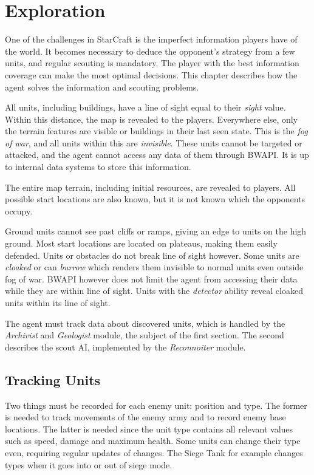 \chapter{Exploration}
\label{ch:exploration}
One of the challenges in StarCraft is the imperfect information players have of the world. It becomes necessary to deduce the opponent's strategy from a few units, and regular scouting is mandatory. The player with the best information coverage can make the most optimal decisions. This chapter describes how the agent solves the information and scouting problems.

All units, including buildings, have a line of sight equal to their \emph{sight} value. Within this distance, the map is revealed to the players. Everywhere else, only the terrain features are visible or buildings in their last seen state. This is the \emph{fog of war}, and all units within this are \emph{invisible}. These units cannot be targeted or attacked, and the agent cannot access any data of them through BWAPI. It is up to internal data systems to store this information.

The entire map terrain, including initial resources, are revealed to players. All possible start locations are also known, but it is not known which the opponents occupy.

Ground units cannot see past cliffs or ramps, giving an edge to units on the high ground. Most start locations are located on plateaus, making them easily defended. Units or obstacles do not break line of sight however. Some units are \emph{cloaked} or can \emph{burrow} which renders them invisible to normal units even outside fog of war. BWAPI however does not limit the agent from accessing their data while they are within line of sight. Units with the \emph{detector} ability reveal cloaked units within its line of sight.

The agent must track data about discovered units, which is handled by the \emph{Archivist} and \emph{Geologist} module, the subject of the first section. The second describes the scout AI, implemented by the \emph{Reconnoiter} module.

\section{Tracking Units}
Two things must be recorded for each enemy unit: position and type. The former is needed to track movements of the enemy army and to record enemy base locations. The latter is needed since the unit type contains all relevant values such as speed, damage and maximum health. Some units can change their type even, requiring regular updates of changes. The Siege Tank for example changes types when it goes into or out of siege mode.

